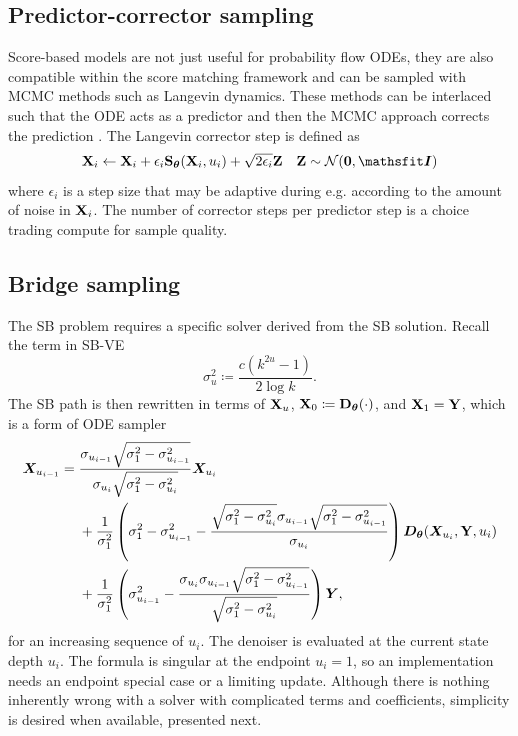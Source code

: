 \subsection{Predictor-corrector sampling}
Score-based models are not just useful for probability flow \acp{ODE}, they are also compatible within the score matching framework and can be sampled with \ac{MCMC} methods such as Langevin dynamics. These methods can be interlaced such that the \ac{ODE} acts as a predictor and then the \ac{MCMC} approach corrects the prediction \citep{song2021sde}. The Langevin corrector step is defined as
\[
\rmX_i\leftarrow\rmX_i + \epsilon_i\rmS_\vtheta(\rmX_i,u_i) + \sqrt{2\epsilon_i}\rmZ \quad \rmZ\sim\gN(\bm0,\tI)
\]
where $\epsilon_i$ is a step size that may be adaptive during e.g. according to the amount of noise in ${\mathbf{X}}_i$. The number of corrector steps per predictor step is a choice trading compute for sample quality.


\subsection{Bridge sampling}
The \ac{SB} problem requires a specific solver  derived from the \ac{SB} solution.
Recall the term in \ac{SB-VE}
\[
\sigma_u^2 \coloneqq \frac{c(k^{2u}-1)}{2 \log k}.
\]
The \ac{SB} path is then rewritten in terms of ${\mathbf{X}}_u$, ${\mathbf{X}}_0\coloneqq{\mathbf{D}}_{\bm{\theta}}(\cdot)$, and ${\mathbf{X}}_1={\mathbf{Y}}$, which is a form of \ac{ODE} sampler
\[
\begin{aligned}
{\bm{X}}_{u_{i-1}}
={}&
\frac{
    \sigma_{u_{i-1}}\sqrt{\sigma_1^2-\sigma_{u_{i-1}}^2}
}{
    \sigma_{u_i}\sqrt{\sigma_1^2-\sigma_{u_i}^2}
}
{\bm{X}}_{u_i}
\\
&+
\frac{1}{\sigma_1^2}
\left(
    \sigma_1^2-\sigma_{u_{i-1}}^2
    -
    \frac{
        \sqrt{\sigma_1^2-\sigma_{u_i}^2}
        \sigma_{u_{i-1}}
        \sqrt{\sigma_1^2-\sigma_{u_{i-1}}^2}
    }{
        \sigma_{u_i}
    }
\right)
    {\bm{D}}_{\bm{\theta}}({\bm{X}}_{u_i},{\mathbf{Y}},u_i)
\\
&+
\frac{1}{\sigma_1^2}
\left(
    \sigma_{u_{i-1}}^2
    -
    \frac{
        \sigma_{u_i}\sigma_{u_{i-1}}
        \sqrt{\sigma_1^2-\sigma_{u_{i-1}}^2}
    }{
        \sqrt{\sigma_1^2-\sigma_{u_i}^2}
    }
\right)
{\bm{Y}},
\end{aligned}
\]
for an increasing sequence of $u_i$. The denoiser is evaluated at the current state depth $u_i$. The formula is singular at the endpoint $u_i=1$, so an implementation needs an endpoint special case or a limiting update. Although there is nothing inherently wrong with a solver with complicated terms and coefficients, simplicity is desired when available, presented next.

